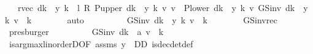 \begin{isabellebody}
\ {\isachardoublequoteopen}{\isasymdots}\ {\isacharequal}{\kern0pt}\ {\isacharparenleft}{\kern0pt}r{\isacharunderscore}{\kern0pt}vec\ {\isacharparenleft}{\kern0pt}d{\isacharparenleft}{\kern0pt}k\ {\isacharcolon}{\kern0pt}{\isacharequal}{\kern0pt}\ y\ k{\isacharparenright}{\kern0pt}{\isacharparenright}{\kern0pt}\ {\isacharplus}{\kern0pt}\ l\ {\isacharasterisk}{\kern0pt}\isactrlsub R\ {\isacharparenleft}{\kern0pt}{\isacharparenleft}{\kern0pt}P{\isacharunderscore}{\kern0pt}upper\ {\isacharparenleft}{\kern0pt}d{\isacharparenleft}{\kern0pt}k\ {\isacharcolon}{\kern0pt}{\isacharequal}{\kern0pt}\ y\ k{\isacharparenright}{\kern0pt}{\isacharparenright}{\kern0pt}\ {\isacharasterisk}{\kern0pt}v\ v{\isacharparenright}{\kern0pt}\ {\isacharplus}{\kern0pt}\ {\isacharparenleft}{\kern0pt}P{\isacharunderscore}{\kern0pt}lower\ {\isacharparenleft}{\kern0pt}d{\isacharparenleft}{\kern0pt}k\ {\isacharcolon}{\kern0pt}{\isacharequal}{\kern0pt}\ y\ k{\isacharparenright}{\kern0pt}{\isacharparenright}{\kern0pt}\ {\isacharasterisk}{\kern0pt}v\ GS{\isacharunderscore}{\kern0pt}inv\ {\isacharparenleft}{\kern0pt}d{\isacharparenleft}{\kern0pt}k\ {\isacharcolon}{\kern0pt}{\isacharequal}{\kern0pt}\ y\ k{\isacharparenright}{\kern0pt}{\isacharparenright}{\kern0pt}\ v{\isacharparenright}{\kern0pt}{\isacharparenright}{\kern0pt}{\isacharparenright}{\kern0pt}\ {\isachardollar}{\kern0pt}\ k{\isachardoublequoteclose}\isanewline
\ \ \ \ \ \ \isamarkupfalse%
\ auto\isanewline
\ \ \ \ \isamarkupfalse%
\ \isamarkupfalse%
\ {\isachardoublequoteopen}{\isasymdots}\ {\isacharequal}{\kern0pt}\ GS{\isacharunderscore}{\kern0pt}inv\ {\isacharparenleft}{\kern0pt}d{\isacharparenleft}{\kern0pt}k\ {\isacharcolon}{\kern0pt}{\isacharequal}{\kern0pt}\ y\ k{\isacharparenright}{\kern0pt}{\isacharparenright}{\kern0pt}\ v\ {\isachardollar}{\kern0pt}\ k{\isachardoublequoteclose}\isanewline
\ \ \ \ \ \ \isamarkupfalse%
\ GS{\isacharunderscore}{\kern0pt}inv{\isacharunderscore}{\kern0pt}rec\ \isamarkupfalse%
\ presburger\isanewline
\ \ \ \ \isamarkupfalse%
\ \isamarkupfalse%
\ {\isachardoublequoteopen}{\isasymdots}\ {\isasymle}\ GS{\isacharunderscore}{\kern0pt}inv\ {\isacharparenleft}{\kern0pt}d{\isacharparenleft}{\kern0pt}k\ {\isacharcolon}{\kern0pt}{\isacharequal}{\kern0pt}\ a{\isacharparenright}{\kern0pt}{\isacharparenright}{\kern0pt}\ v\ {\isachardollar}{\kern0pt}\ k{\isachardoublequoteclose}\isanewline
\ \ \ \ \ \ \isamarkupfalse%
\ is{\isacharunderscore}{\kern0pt}arg{\isacharunderscore}{\kern0pt}max{\isacharunderscore}{\kern0pt}linorderD{\isacharparenleft}{\kern0pt}{}{\isacharparenright}{\kern0pt}{\isacharbrackleft}{\kern0pt}OF\ assms{\isacharparenleft}{\kern0pt}{}{\isacharparenright}{\kern0pt}{\isacharbrackright}{\kern0pt}\ {\isacartoucheopen}y\ {\isasymin}\ D\isactrlsub D{\isacartoucheclose}\ is{\isacharunderscore}{\kern0pt}dec{\isacharunderscore}{\kern0pt}det{\isacharunderscore}{\kern0pt}def\isanewline

\end{isabellebody}
